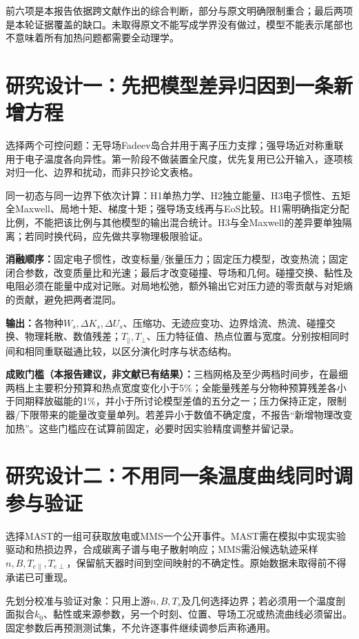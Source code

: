 前六项是本报告依据跨文献作出的综合判断，部分与原文明确限制重合；最后两项是本轮证据覆盖的缺口。未取得原文不能写成学界没有做过，模型不能表示尾部也不意味着所有加热问题都需要全动理学。

\section{研究设计一：先把模型差异归因到一条新增方程}
选择两个可控问题：无导场Fadeev岛合并用于离子压力支撑；强导场近对称重联用于电子温度各向异性。第一阶段不做装置全尺度，优先复用已公开输入，逐项核对归一化、边界和扰动，而非只抄论文表格。

同一初态与同一边界下依次计算：H1单热力学、H2独立能量、H3电子惯性、五矩全Maxwell、局地十矩、梯度十矩；强导场支线再与EoS比较。H1需明确指定分配比例，不能把该比例与其他模型的输出混合统计。H3与全Maxwell的差异要单独隔离；若同时换代码，应先做共享物理极限验证。

\textbf{消融顺序：}固定电子惯性，改变标量/张量压力；固定压力模型，改变热流；固定闭合参数，改变质量比和光速；最后才改变碰撞、导场和几何。碰撞交换、黏性及电阻必须在能量中成对记账。对局地松弛，额外输出它对压力迹的零贡献与对矩熵的贡献，避免把两者混同。

\textbf{输出：}各物种$W_s,\Delta K_s,\Delta U_s$、压缩功、无迹应变功、边界焓流、热流、碰撞交换、物理耗散、数值残差；$T_{\parallel},T_\perp$、压力特征值、热点位置与宽度。分别按相同时间和相同重联磁通比较，以区分演化时序与状态结构。

\textbf{成败门槛（本报告建议，非文献已有结果）：}三档网格及至少两档时间步，在最细两档上主要积分预算和热点宽度变化小于5\%；全能量残差与分物种预算残差各小于同期释放磁能的1\%，并小于所讨论模型差值的五分之一；压力保持正定，限制器/下限带来的能量改变量单列。若差异小于数值不确定度，不报告“新增物理改变加热”。这些门槛应在试算前固定，必要时因实验精度调整并留记录。

\section{研究设计二：不用同一条温度曲线同时调参与验证}
选择MAST的一组可获取放电或MMS一个公开事件。MAST需在模拟中实现实验驱动和热损边界，合成碳离子谱与电子散射响应；MMS需沿候选轨迹采样$n,B,T_{e\parallel},T_{e\perp}$，保留航天器时间到空间映射的不确定性。原始数据未取得前不得承诺已可重现。

先划分校准与验证对象：只用上游$n,B,T_s$及几何选择边界；若必须用一个温度剖面拟合$k_0$、黏性或来源参数，另一个时刻、位置、导场工况或热流曲线必须留出。固定参数后再预测测试集，不允许逐事件继续调参后声称通用。

